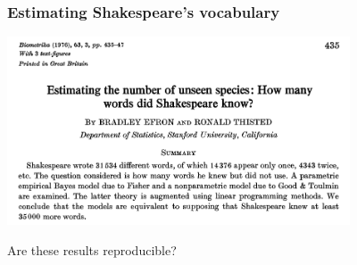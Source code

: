 \begin{frame}
    \frametitle{Estimating Shakespeare's vocabulary}
    \begin{center}
        \includegraphics[width=4in]{../compendium/Figures/ET-Titles.pdf}        
    \end{center}
		\pause
	
	{\color{red}Are these results reproducible?}
\end{frame}

